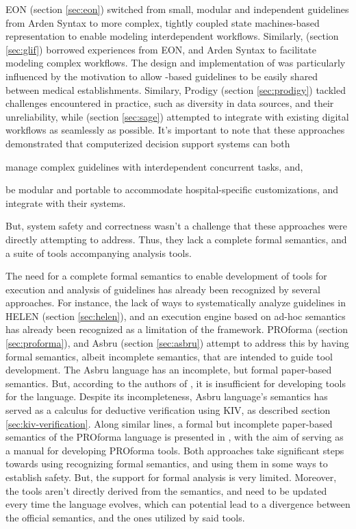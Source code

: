 EON (section \ref{sec:eon}) switched from small, modular and
independent guidelines from Arden Syntax to more complex,
tightly coupled state machines-based representation to enable modeling
interdependent workflows. Similarly, \GLIF{} (section \ref{sec:glif}) borrowed experiences from
EON, \GEODECM{} and Arden Syntax to facilitate modeling complex workflows.
The design and implementation of \GLIF{} was particularly influenced
by the motivation to allow \GLIF{}-based guidelines to be easily shared
between medical establishments. Similary, Prodigy (section \ref{sec:prodigy})
tackled \CDSSs{} challenges encountered in practice, such as diversity in
data sources, and their unreliability, while \SAGE{} (section \ref{sec:sage})
attempted to integrate with existing digital workflows as seamlessly as
possible. It's important to note that these approaches demonstrated that computerized decision support
systems can both
\begin{enumerate*}[label=(\alph*)]
  \item manage complex guidelines with interdependent concurrent tasks, and,
  \item be modular and portable to accommodate hospital-specific customizations,
    and integrate with their \EHR{} systems.
\end{enumerate*}
But, system safety and correctness wasn't a challenge that these approaches
were directly attempting to address.
Thus, they lack a complete formal semantics, and a suite of tools accompanying
analysis tools.

The need for a complete formal semantics to enable development of tools for
execution and analysis of guidelines has already been recognized by several
approaches. For instance, the lack of ways to systematically analyze guidelines
in HELEN (section \ref{sec:helen}), and an execution engine based on ad-hoc
semantics has already been recognized as a limitation of the framework.
 PROforma (section \ref{sec:proforma}), and
Asbru (section \ref{sec:asbru}) attempt to address this by having formal
semantics, albeit incomplete semantics, that are intended to guide tool
development. The Asbru language has an incomplete, but formal
\SOS{} paper-based semantics. But, according to the authors of
\cite{SuttonAMIA03}, it is insufficient for developing tools for the language.
Despite its incompleteness, Asbru language's semantics has served as a calculus for deductive verification
using KIV, as described section \ref{sec:kiv-verification}.
Along similar lines, a formal but incomplete paper-based semantics
of the PROforma language is
presented in \cite{SuttonAMIA03}, with the aim of serving as a manual for
developing PROforma tools. Both approaches take significant steps towards using
recognizing formal semantics, and using them in some ways
to establish \CDSS{} safety. But, the support for formal analysis is very
limited. Moreover, the tools aren't directly derived
from the semantics, and need to be updated every time the language evolves,
which can potential lead to a divergence between the official semantics, and
the ones utilized by said tools.


